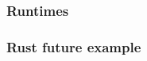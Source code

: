 \begin{frame}[fragile]
    \frametitle{Runtimes}
% 
% 
% 
% 
\end{frame}
\begin{frame}[fragile]
    \frametitle{Rust future example}
% 
% 
% 
% 
% 
% 
\end{frame}
